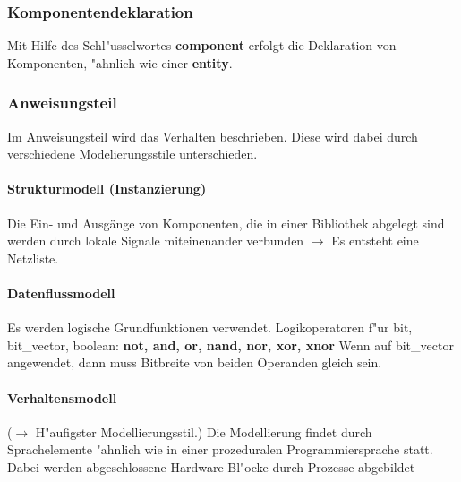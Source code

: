 		\subsubsection{Komponentendeklaration}
			Mit Hilfe des Schl"usselwortes \textbf{component} erfolgt die Deklaration von 
			Komponenten, "ahnlich wie einer \textbf{entity}.\\
			
			
		\subsubsection{Anweisungsteil}
			Im Anweisungsteil wird das Verhalten beschrieben. Diese wird dabei 		
			durch verschiedene Modelierungsstile unterschieden.
			\begin{multicols}{2}
				\paragraph{Strukturmodell (Instanzierung)}
				Die Ein- und Ausgänge von Komponenten, die 
				in einer Bibliothek abgelegt sind werden durch lokale Signale miteinenander 
				verbunden $\rightarrow$ Es entsteht eine Netzliste. 
				
			
			
			\paragraph{Datenflussmodell}
				Es werden logische Grundfunktionen verwendet.
				Logikoperatoren f"ur bit, bit\_vector, boolean: \textbf{not, and, or, nand, nor,
 				xor, xnor	} Wenn auf bit\_vector angewendet, dann muss Bitbreite von 
				beiden Operanden gleich sein.

					
					
			\end{multicols}
			\paragraph{Verhaltensmodell} ($\rightarrow$ H"aufigster Modellierungsstil.) 
				Die Modellierung findet durch Sprachelemente "ahnlich wie in einer 	
				prozeduralen Programmiersprache statt.\\
				Dabei werden abgeschlossene Hardware-Bl"ocke durch Prozesse 
				abgebildet
				

